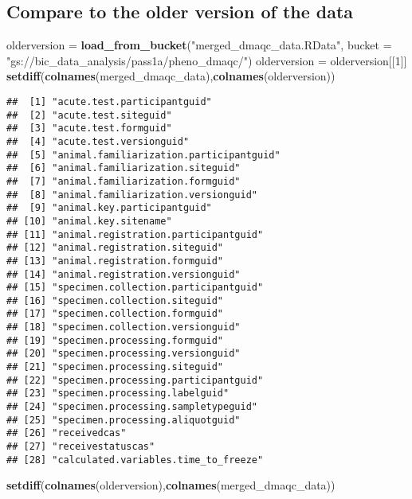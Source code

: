 \documentclass[]{article}
\newenvironment{Shaded}{\begin{snugshade}}{\end{snugshade}}
\newcommand{\KeywordTok}[1]{\textcolor[rgb]{0.13,0.29,0.53}{\textbf{#1}}}
\newcommand{\DataTypeTok}[1]{\textcolor[rgb]{0.13,0.29,0.53}{#1}}
\newcommand{\DecValTok}[1]{\textcolor[rgb]{0.00,0.00,0.81}{#1}}
\newcommand{\StringTok}[1]{\textcolor[rgb]{0.31,0.60,0.02}{#1}}
\newcommand{\NormalTok}[1]{#1}
\begin{document}
\subsection{Compare to the older version of the
data}\label{compare-to-the-older-version-of-the-data}

\begin{Shaded}
\begin{Highlighting}[]
\NormalTok{olderversion =}\StringTok{ }
\StringTok{  }\KeywordTok{load_from_bucket}\NormalTok{(}\StringTok{"merged_dmaqc_data.RData"}\NormalTok{,}
                   \DataTypeTok{bucket =} \StringTok{"gs://bic_data_analysis/pass1a/pheno_dmaqc/"}\NormalTok{)}
\NormalTok{olderversion =}\StringTok{ }\NormalTok{olderversion[[}\DecValTok{1}\NormalTok{]]}
\KeywordTok{setdiff}\NormalTok{(}\KeywordTok{colnames}\NormalTok{(merged_dmaqc_data),}\KeywordTok{colnames}\NormalTok{(olderversion))}
\end{Highlighting}
\end{Shaded}

\begin{verbatim}
##  [1] "acute.test.participantguid"            
##  [2] "acute.test.siteguid"                   
##  [3] "acute.test.formguid"                   
##  [4] "acute.test.versionguid"                
##  [5] "animal.familiarization.participantguid"
##  [6] "animal.familiarization.siteguid"       
##  [7] "animal.familiarization.formguid"       
##  [8] "animal.familiarization.versionguid"    
##  [9] "animal.key.participantguid"            
## [10] "animal.key.sitename"                   
## [11] "animal.registration.participantguid"   
## [12] "animal.registration.siteguid"          
## [13] "animal.registration.formguid"          
## [14] "animal.registration.versionguid"       
## [15] "specimen.collection.participantguid"   
## [16] "specimen.collection.siteguid"          
## [17] "specimen.collection.formguid"          
## [18] "specimen.collection.versionguid"       
## [19] "specimen.processing.formguid"          
## [20] "specimen.processing.versionguid"       
## [21] "specimen.processing.siteguid"          
## [22] "specimen.processing.participantguid"   
## [23] "specimen.processing.labelguid"         
## [24] "specimen.processing.sampletypeguid"    
## [25] "specimen.processing.aliquotguid"       
## [26] "receivedcas"                           
## [27] "receivestatuscas"                      
## [28] "calculated.variables.time_to_freeze"
\end{verbatim}

\begin{Shaded}
\begin{Highlighting}[]
\KeywordTok{setdiff}\NormalTok{(}\KeywordTok{colnames}\NormalTok{(olderversion),}\KeywordTok{colnames}\NormalTok{(merged_dmaqc_data))}
\end{Highlighting}
\end{Shaded}
\end{document}
